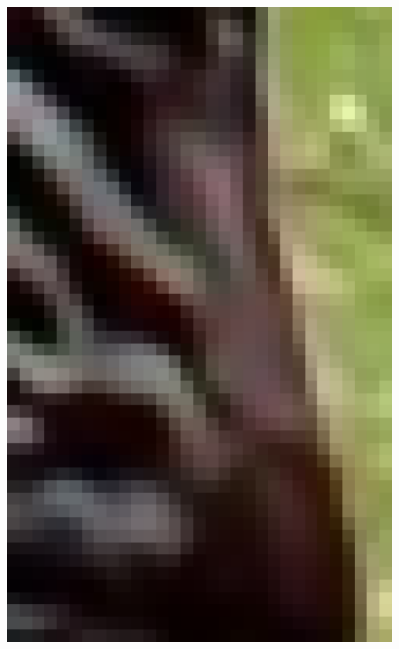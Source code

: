 \documentclass[review,numbers,sort&compress]{elsarticle}  %
\begin{document}
\begin{figure}[t]
{\begin{minipage}[b]{0.12\textwidth}
                \includegraphics[width=1\textwidth]{compareImage/LapSRN_zebra_mag_2.png}
            \end{minipage}
        }
\end{figure}
\end{document}
